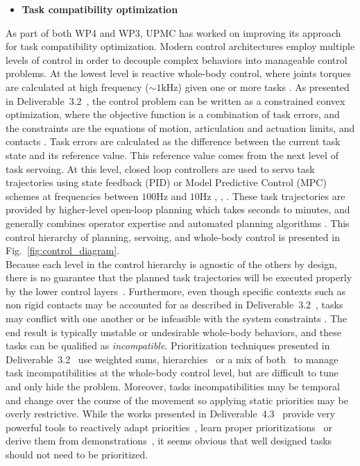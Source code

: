 \begin{itemize}
\item \textbf{Task compatibility optimization}
\end{itemize}
As part of both WP4 and WP3, UPMC has worked on improving its approach for task compatibility optimization. Modern control architectures employ multiple levels of control in order to decouple complex behaviors into manageable control problems. At the lowest level is reactive whole-body control, where joints torques are calculated at high frequency ($\sim1$kHz) given one or more tasks \cite{Khatib2004}. As presented in Deliverable~3.2~\cite{deliverable32}, the control problem can be written as a constrained convex optimization, where the objective function is a combination of task errors, and the constraints are the equations of motion, articulation and actuation limits, and contacts \cite{Salini2011, Saab2013, Bouyarmane2011}. Task errors are calculated as the difference between the current task state and its reference value. This reference value comes from the next level of task servoing. At this level, closed loop controllers are used to servo task trajectories using state feedback (PID) or Model Predictive Control (MPC) schemes at frequencies between $100$Hz and $10$Hz  \cite{Ibanez2014}, \cite{Koenemann2015}, \cite{Perrin2015}. These task trajectories are provided by higher-level open-loop planning which takes seconds to minutes, and generally combines operator expertise and automated planning algorithms \cite{Bouyarmane2012, Pham2014}. This control hierarchy of planning, servoing, and whole-body control is presented in Fig.~\ref{fig:control_diagram}.\\

Because each level in the control hierarchy is agnostic of the others by design, there is no guarantee that the planned task trajectories will be executed properly by the lower control layers~\cite{padois-HDR2016,ibanez_humanoidhandbook2016}. Furthermore, even though specific contexts such as non rigid contacts may be accounted for as described in Deliverable~3.2~\cite{deliverable32}, tasks may conflict with one another or be infeasible with the system constraints \cite{Bouyarmane2015, Wieber2017}. The end result is typically unstable or undesirable whole-body behaviors, and these tasks can be qualified as \textit{incompatible}. Prioritization techniques presented in Deliverable~3.2~\cite{deliverable32} use weighted sums\cite{Salini2011, Bouyarmane2011}, hierarchies~\cite{Saab2013,Escande2014, Dietrich2015} or a mix of both~\cite{liu-AutRob2015,liu-AutRobSI2015} to manage task incompatibilities at the whole-body control level, but are difficult to tune and only hide the problem. Moreover, tasks incompatibilities may be temporal and change over the course of the movement so applying static priorities may be overly restrictive. While the works presented in Deliverable~4.3~\cite{deliverable43} provide very powerful tools to reactively adapt priorities~\cite{Lober2015}, learn proper prioritizations~\cite{Modugno2016,modugno2016learning} or derive them from demonstrations~\cite{Paraschos_2017}, it seems obvious that well designed tasks should not need to be prioritized.\\

